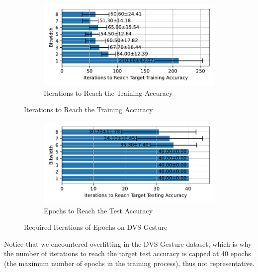     \label{appendix:iterations_dvs_gesture}
        \begin{figure}[H]
            \centering
            \begin{subfigure}[H]{0.6\textwidth}
                \centering
                \includegraphics[width=\textwidth]{../standard/DVSGesture/plots/dvsgesture_train_iters_horizontal.pdf}
                \caption{Iterations to Reach the Training Accuracy}
            \end{subfigure}
        \end{figure}
        \begin{figure}[H]
            \centering
            \ContinuedFloat
            \begin{subfigure}[H]{0.6\textwidth}
                \centering
                \includegraphics[width=\textwidth]{../standard/DVSGesture/plots/dvsgesture_test_iters_horizontal.pdf}
                \caption{Epochs to Reach the Test Accuracy}
            \end{subfigure}
            \caption{Required Iterations of Epochs on DVS Gesture}
        \end{figure}

    Notice that we encountered overfitting in the DVS Gesture dataset, which is why the number of iterations to reach the target test accuracy is capped at 40 epochs (the maximum number of epochs in the training process), thus not representative. 

